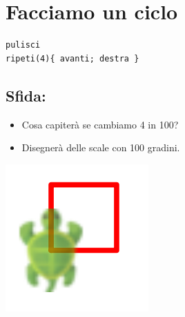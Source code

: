 \chapter{Facciamo un ciclo}
\begin{multicols}{2}

\begin{lstlisting}[basicstyle={\ttfamily\fontsize{30}{36}\selectfont},numbers=none]
pulisci
ripeti(4){ avanti; destra }
\end{lstlisting}
        
\section*{\color{BrickRed}Sfida:}


\begin{itemize}

\item {Cosa capiterà se cambiamo 4 in 100?}
\item {Disegnerà delle scale con 100 gradini.}

\end{itemize}



\columnbreak

\begin{center}
\includegraphics{../img/square.png}
\end{center}

\end{multicols}

